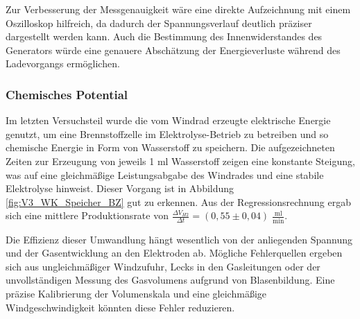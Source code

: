 \documentclass{article}
\begin{document}
\vspace{2mm}

\noindent Zur Verbesserung der Messgenauigkeit wäre eine direkte Aufzeichnung mit einem Oszilloskop hilfreich, da dadurch der Spannungsverlauf deutlich präziser dargestellt werden kann. Auch die Bestimmung des Innenwiderstandes des Generators würde eine genauere Abschätzung der Energieverluste während des Ladevorgangs ermöglichen.

\subsubsection{Chemisches Potential}
\noindent Im letzten Versuchsteil wurde die vom Windrad erzeugte elektrische Energie genutzt, um eine Brennstoffzelle im Elektrolyse-Betrieb zu betreiben und so chemische Energie in Form von Wasserstoff zu speichern. Die aufgezeichneten Zeiten zur Erzeugung von jeweils 1 ml Wasserstoff zeigen eine konstante Steigung, was auf eine gleichmäßige Leistungsabgabe des Windrades und eine stabile Elektrolyse hinweist. Dieser Vorgang ist in Abbildung \ref{fig:V3_WK_Speicher_BZ} gut zu erkennen. Aus der Regressionsrechnung ergab sich eine mittlere Produktionsrate von $\frac{\Delta V_{H2}}{\Delta t} = (0{,}55 \pm 0{,}04) \; \frac{\text{ml}}{\text{min}}$.

\vspace{2mm}

\noindent Die Effizienz dieser Umwandlung hängt wesentlich von der anliegenden Spannung und der Gasentwicklung an den Elektroden ab. Mögliche Fehlerquellen ergeben sich aus ungleichmäßiger Windzufuhr, Lecks in den Gasleitungen oder der unvollständigen Messung des Gasvolumens aufgrund von Blasenbildung. Eine präzise Kalibrierung der Volumenskala und eine gleichmäßige Windgeschwindigkeit könnten diese Fehler reduzieren.

\newpage



\listoffigures
\listoftables
\end{document}
